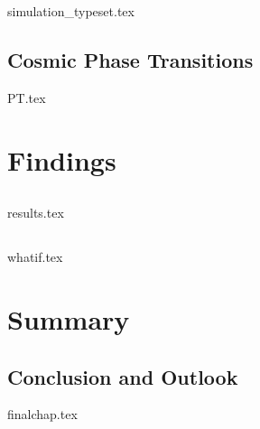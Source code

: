 \documentclass[UKenglish]{texmex/uiomasterthesis}
\begin{document}
{{simulation_typeset.tex}


\chapter{Cosmic Phase Transitions}\label{chap:PT}
    {{PT.tex}}

















\part{Findings}\label{part:findings}



\chapter{}\label{chap:results}
    {{results.tex}}


\chapter{}\label{chap:whatif}
    {{whatif.tex}}








\part*{Summary} %


\chapter{Conclusion and Outlook}
    {{finalchap.tex}}
}
\end{document}
